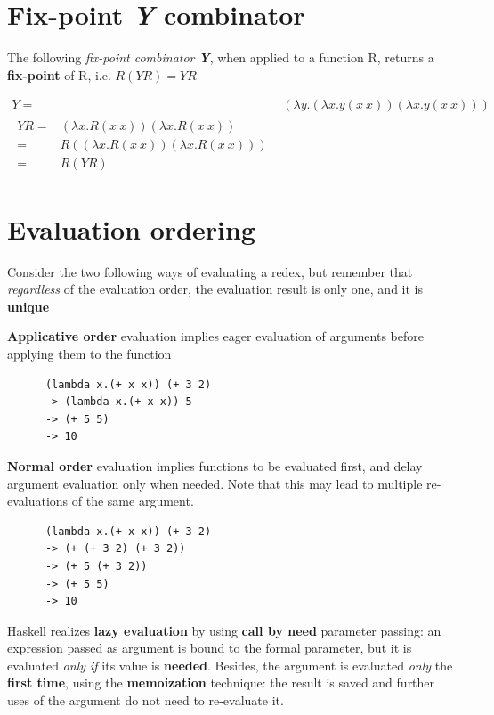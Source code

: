 \section{Fix-point \textit{Y} combinator}

The following \textit{fix-point combinator \textbf{Y}}, when applied to a function R,
returns a \textbf{fix-point} of R, i.e. $R(YR) = YR$

\begin{align}
   Y =& (\lambda y.(\lambda x.y(x\ x))(\lambda x.y(x\ x)))\\
   \begin{split}
      YR =& (\lambda x.R(x\ x))(\lambda x.R(x\ x))\\
         =& R((\lambda x.R(x\ x))(\lambda x.R(x\ x)))\\
         =& R(YR)
   \end{split}
\end{align}

\section{Evaluation ordering}
Consider the two following ways of evaluating a redex,
but remember that \textit{regardless} of the evaluation order,
the evaluation result is only one,
and it is \textbf{unique}\footnotemark
\begin{paracol}{2}
   \colfill
   \textbf{Applicative order} evaluation implies eager evaluation of arguments before applying them to the function
   \begin{lstlisting}
      (lambda x.(+ x x)) (+ 3 2)
      -> (lambda x.(+ x x)) 5
      -> (+ 5 5)
      -> 10
   \end{lstlisting}
   \colfill

   \switchcolumn
   \textbf{Normal order} evaluation implies functions to be evaluated first,
   and delay argument evaluation only when needed.
   Note that this may lead to multiple re-evaluations of the same argument.
   \begin{lstlisting}
      (lambda x.(+ x x)) (+ 3 2)
      -> (+ (+ 3 2) (+ 3 2))
      -> (+ 5 (+ 3 2))
      -> (+ 5 5)
      -> 10
   \end{lstlisting}
\end{paracol}
Haskell realizes \textbf{lazy evaluation} by using \textbf{call by need} parameter passing: 
an expression passed as
argument is bound to the formal parameter, but it is
evaluated \textit{only if} its value is \textbf{needed}.
Besides, 
the argument is evaluated \textit{only} the \textbf{first time}, using
the \textbf{memoization} technique: the result is saved and
further uses of the argument do not need to re-evaluate it.

